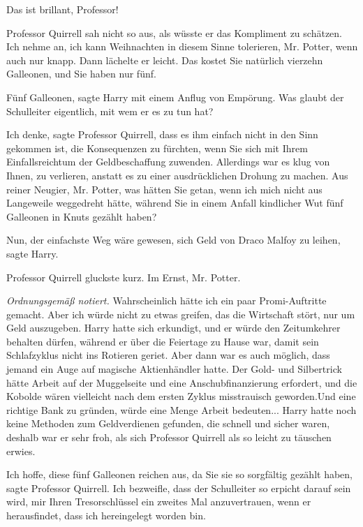 \glqq{}Das ist brillant, Professor!\grqq{}

Professor Quirrell sah nicht so aus, als wüsste er das Kompliment zu schätzen.
\glqq{}Ich nehme an, ich kann Weihnachten in diesem Sinne tolerieren, Mr. Potter,
wenn auch nur knapp.\grqq{} Dann lächelte er leicht. \glqq{}Das kostet Sie natürlich
vierzehn Galleonen, und Sie haben nur fünf.\grqq{}

\glqq{}Fünf Galleonen\grqq{}, sagte Harry mit einem Anflug von Empörung. \glqq{}
Was glaubt der Schulleiter eigentlich, mit wem er es zu tun hat?\grqq{}

\glqq{}Ich denke\grqq{}, sagte Professor Quirrell, \glqq{}dass es ihm einfach
nicht in den Sinn gekommen ist, die Konsequenzen zu fürchten, wenn Sie sich mit
Ihrem Einfallsreichtum der Geldbeschaffung zuwenden. Allerdings war es klug von
Ihnen, zu verlieren, anstatt es zu einer ausdrücklichen Drohung zu machen. Aus
reiner Neugier, Mr. Potter, was hätten Sie getan, wenn ich mich nicht aus
Langeweile weggedreht hätte, während Sie in einem Anfall kindlicher Wut fünf
Galleonen in Knuts gezählt haben?\grqq{}

\glqq{}Nun, der einfachste Weg wäre gewesen, sich Geld von Draco Malfoy zu
leihen\grqq{}, sagte Harry.

Professor Quirrell gluckste kurz. \glqq{}Im Ernst, Mr. Potter.\grqq{}

\emph{Ordnungsgemäß notiert.}
\glqq{}Wahrscheinlich hätte ich ein paar Promi-Auftritte gemacht. Aber ich würde
nicht zu etwas greifen, das die Wirtschaft stört, nur um Geld auszugeben.\grqq{} Harry
hatte sich erkundigt, und er würde den Zeitumkehrer behalten dürfen, während er
über die Feiertage zu Hause war, damit sein Schlafzyklus nicht ins Rotieren
geriet. Aber dann war es auch möglich, dass jemand ein Auge auf magische
Aktienhändler hatte. Der Gold- und Silbertrick hätte Arbeit auf der Muggelseite
und eine Anschubfinanzierung erfordert, und die Kobolde wären vielleicht nach
dem ersten Zyklus misstrauisch geworden.Und eine richtige Bank zu gründen, würde
eine Menge Arbeit bedeuten... Harry hatte noch keine Methoden zum Geldverdienen
gefunden, die schnell und sicher waren, deshalb war er sehr froh, als sich
Professor Quirrell als so leicht zu täuschen erwies.

\glqq{}Ich hoffe, diese fünf Galleonen reichen aus, da Sie sie so sorgfältig
gezählt haben\grqq{}, sagte Professor Quirrell. \glqq{}Ich bezweifle, dass der
Schulleiter so erpicht darauf sein wird, mir Ihren Tresorschlüssel ein zweites
Mal anzuvertrauen, wenn er herausfindet, dass ich hereingelegt worden bin.\grqq{}

